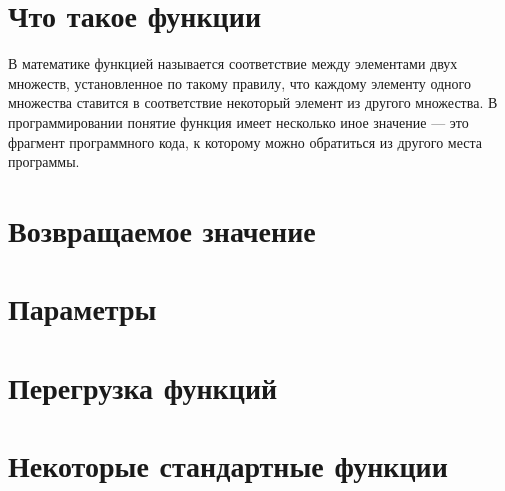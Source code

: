 \documentclass[book.tex]{subfiles}
\begin{document}



\maketitle

\section*{Что такое функции}

В математике функцией называется соответствие между элементами двух множеств, установленное по такому правилу, что каждому элементу одного множества ставится в соответствие некоторый элемент из другого множества. В программировании понятие функция имеет несколько иное значение --- это фрагмент программного кода, к которому можно обратиться из другого места программы.


\section*{Возвращаемое значение}

\section*{Параметры}

\section*{Перегрузка функций}

\section*{Некоторые стандартные функции}
\end{document}

